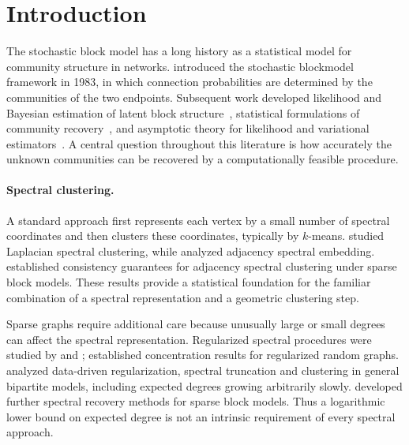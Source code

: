 \section{Introduction}\label{sec:related-work}

The stochastic block model has a long history as a statistical model
for community structure in networks. \citet{holland1983} introduced the stochastic blockmodel
framework in 1983, in which connection probabilities are determined by the
communities of the two endpoints. Subsequent work developed likelihood
and Bayesian estimation of latent block structure~\citep{snijders1997,nowicki2001},
statistical formulations of community recovery~\citep{bickelchen2009},
and asymptotic theory for likelihood and variational
estimators~\citep{bickel2013}. A central question throughout this
literature is how accurately the unknown communities can be recovered
by a computationally feasible procedure.

\paragraph{Spectral clustering.}
A standard approach first represents each vertex by a small number of
spectral coordinates and then clusters these coordinates, typically by
$k$-means. \citet{rohe2011} studied Laplacian
spectral clustering, while \citet{sussman2012} analyzed adjacency spectral embedding.
\citet{lei2015} established consistency guarantees for
adjacency spectral clustering under sparse block models. These results
provide a statistical foundation for the familiar combination of a
spectral representation and a geometric clustering step.

Sparse graphs require additional care because unusually large or small
degrees can affect the spectral representation. Regularized spectral
procedures were studied by \citet{qin2013} and \citet{joseph2016}; \citet{llv2017}
established concentration results for regularized random graphs.
\citet{zhouamini2019} analyzed data-driven
regularization, spectral truncation and clustering in general bipartite
models, including expected degrees growing arbitrarily slowly.
\citet{chin2015} developed further spectral recovery
methods for sparse block models. Thus a logarithmic lower bound on
expected degree is not an intrinsic requirement of every spectral
approach.

